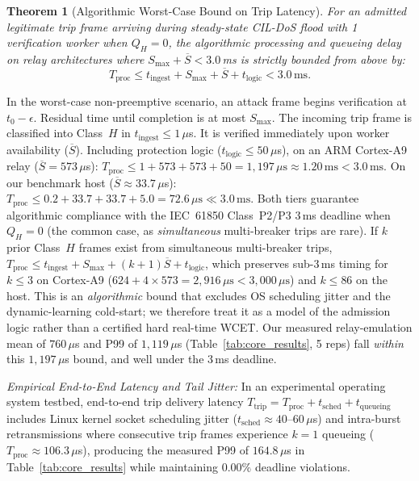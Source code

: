 \documentclass[journal]{IEEEtran}
\newtheorem{theorem}{Theorem}
\newenvironment{proof}{\begin{IEEEproof}}{\end{IEEEproof}}
\begin{document}
\begin{theorem}[Algorithmic Worst-Case Bound on Trip Latency]
\label{thm:deadline}
For an admitted legitimate trip frame arriving during steady-state CIL-DoS flood with 1 verification worker when $Q_H = 0$, the algorithmic processing and queueing delay on relay architectures where $S_{\max} + \overline{S} < 3.0$\,ms is strictly bounded from above by:
\begin{equation}
T_{\text{proc}} \le t_{\text{ingest}} + S_{\max} + \overline{S} + t_{\text{logic}} < 3.0\,\text{ms}.
\end{equation}
\end{theorem}
\begin{proof}
In the worst-case non-preemptive scenario, an attack frame begins verification at $t_0 - \epsilon$. Residual time until completion is at most $S_{\max}$. The incoming trip frame is classified into Class~$H$ in $t_{\text{ingest}} \le 1\,\mu$s. It is verified immediately upon worker availability ($\overline{S}$). Including protection logic ($t_{\text{logic}} \le 50\,\mu$s), on an ARM Cortex-A9 relay ($\overline{S} = 573\,\mu$s):
$T_{\text{proc}} \le 1 + 573 + 573 + 50 = 1{,}197\,\mu\text{s} \approx 1.20\,\text{ms} < 3.0\,\text{ms}$. On our benchmark host ($\overline{S} \approx 33.7\,\mu$s):
$T_{\text{proc}} \le 0.2 + 33.7 + 33.7 + 5.0 = 72.6\,\mu\text{s} \ll 3.0\,\text{ms}$.
Both tiers guarantee algorithmic compliance with the IEC~61850 Class~P2/P3 3\,ms deadline when $Q_H=0$ (the common case, as \emph{simultaneous} multi-breaker trips are rare). If $k$ prior Class~$H$ frames exist from simultaneous multi-breaker trips, $T_{\text{proc}} \le t_{\text{ingest}} + S_{\max} + (k+1)\overline{S} + t_{\text{logic}}$, which preserves sub-3\,ms timing for $k \le 3$ on Cortex-A9 ($624 + 4 \times 573 = 2{,}916\,\mu\text{s} < 3{,}000\,\mu\text{s}$) and $k \le 86$ on the host. This is an \emph{algorithmic} bound that excludes OS scheduling jitter and the dynamic-learning cold-start; we therefore treat it as a model of the admission logic rather than a certified hard real-time WCET. Our measured relay-emulation mean of $760\,\mu$s and P99 of $1{,}119\,\mu$s (Table~\ref{tab:core_results}, 5 reps) fall \emph{within} this $1{,}197\,\mu$s bound, and well under the 3\,ms deadline.

\textit{Empirical End-to-End Latency and Tail Jitter:} In an experimental operating system testbed, end-to-end trip delivery latency $T_{\text{trip}} = T_{\text{proc}} + t_{\text{sched}} + t_{\text{queueing}}$ includes Linux kernel socket scheduling jitter ($t_{\text{sched}} \approx 40\text{--}60\,\mu$s) and intra-burst retransmissions where consecutive trip frames experience $k=1$ queueing ($T_{\text{proc}} \approx 106.3\,\mu$s), producing the measured P99 of $164.8\,\mu$s in Table~\ref{tab:core_results} while maintaining $0.00\%$ deadline violations.
\end{proof}
\end{document}
